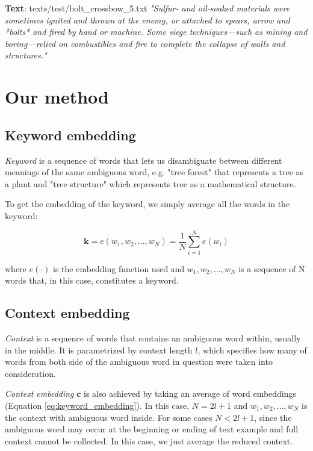 \documentclass{llncs}
\begin{document}
\smallskip
\textbf{Text}: texts/test/bolt\_crossbow\_5.txt\newline
\textit{"Sulfur- and oil-soaked materials were sometimes ignited and thrown at the enemy, or attached to spears, arrow and *bolts* and fired by hand or machine. Some siege techniques—such as mining and boring—relied on combustibles and fire to complete the collapse of walls and structures."}

\section{Our method}
\subsection{Keyword embedding}
\textit{Keyword} is a sequence of words that lets us disambiguate between different meanings of the same ambiguous word, e.g. "tree forest" that represents a tree as a plant and "tree structure" which represents tree as a mathematical structure.

To get the embedding of the keyword, we simply average all the words in the keyword:

\begin{equation}
    \label{eq:keyword_embedding}
    \bm{k} = e(w_1, w_2, ..., w_N) = \frac{1}{N}\sum_{i=1}^{N} e(w_i)
\end{equation}

where \(e(\cdot)\) is the embedding function used and \(w_1, w_2, ..., w_N\) is a sequence of N words that, in this case, constitutes a keyword.

\subsection{Context embedding}
\textit{Context} is a sequence of words that contains an ambiguous word within, usually in the middle.
It is parametrized by context length \(l\), which specifies how many of words from both side of the ambiguous word in question were taken into consideration.

\textit{Context embedding} \(\bm{c}\) is also achieved by taking an average of word embeddings (Equation \ref{eq:keyword_embedding}).
In this case, \(N = 2l + 1\) and \(w_1, w_2, ..., w_N\) is the context with ambiguous word inside. For some cases \(N < 2l + 1\), since the ambiguous word may occur at the beginning or ending of text example and full context cannot be collected.
In this case, we just average the reduced context.
\end{document}
